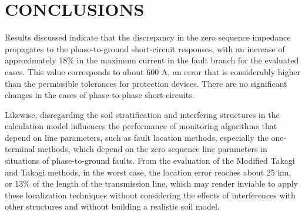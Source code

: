 \documentclass[conference]{IEEEtran}
\begin{document}
\section{CONCLUSIONS}

Results discussed indicate that the discrepancy in the zero sequence impedance propagates to the phase-to-ground short-circuit responses, with an increase of approximately 18\% in the maximum current in the fault branch for the evaluated cases. This value corresponds to about 600 A, an error that is considerably higher than the permissible tolerances for protection devices. There are no significant changes in the cases of phase-to-phase short-circuits.

Likewise, disregarding the soil stratification and interfering structures in the calculation model influences the performance of monitoring algorithms that depend on line parameters, such as fault location methods, especially the one-terminal methods, which depend on the zero sequence line parameters in situations of phase-to-ground faults. From the evaluation of the Modified Takagi and Takagi methods, in the worst case, the location error reaches about 25 km, or 13\% of the length of the transmission line, which may render inviable to apply these localization techniques without considering the effects of interferences with other structures and without building a realistic soil model.



\nocite{*}

\end{document}
